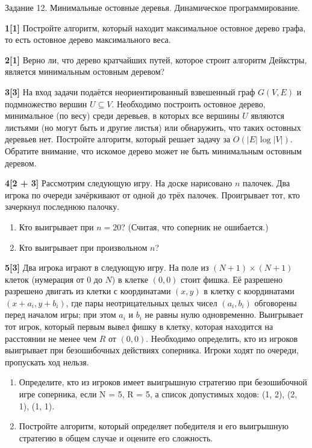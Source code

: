 \documentclass{article}
\begin{document}
\begin{center}
\Large {Задание 12. Минимальные остовные деревья. Динамическое программирование.}
\end{center}

\bigskip

\textbf{1[1]} Постройте алгоритм, который находит максимальное остовное дерево графа, то есть
остовное дерево максимального веса.

\medskip

\textbf{2[1]} Верно ли, что дерево кратчайших путей, которое строит алгоритм Дейкстры, является минимальным
остовным деревом?

\medskip

\textbf{3[3]} На вход задачи подаётся неориентированный взвешенный граф $G(V, E)$ и подмножество вершин $U \subseteq V$. Необходимо построить остовное дерево, минимальное (по весу) среди деревьев, в которых все вершины $U$ являются листьями (но могут быть и другие листья) или обнаружить, что таких остовных деревьев нет. Постройте алгоритм, который решает задачу за $O(|E| \log |V |)$. Обратите внимание, что искомое дерево может не быть минимальным остовным деревом.

\medskip

\textbf{4[2 + 3]} Рассмотрим следующую игру. На доске нарисовано $n$ палочек. Два игрока по очереди зачёркивают от одной до трёх палочек. Проигрывает тот, кто зачеркнул последнюю палочку.

\begin{enumerate}
    \item Кто выигрывает при $n = 20$? (Считая, что соперник не ошибается.)
    \item Кто выигрывает при произвольном $n$?
\end{enumerate}

\textbf{5[3]} Два игрока играют в следующую игру. На поле из $(N + 1) \times (N + 1)$ клеток (нумерация от $0$ до $N$) в клетке $(0, 0)$ стоит фишка. Её разрешено разрешено двигать из клетки с координатами $(x, y)$ в клетку с координатами $(x + a_i, y + b_i)$, где пары неотрицательных целых чисел $(a_i, b_i)$ обговорены перед началом игры; при этом $a_i$ и $b_i$ не равны нулю одновременно. Выигрывает тот игрок, который первым вывел фишку в клетку, которая находится на расстоянии не менее чем $R$ от $(0, 0)$. Необходимо определить, кто из игроков выигрывает при безошибочных действиях соперника. Игроки ходят по очереди, пропускать ход нельзя.

\begin{enumerate}
    \item Определите, кто из игроков имеет выигрышную стратегию при безошибочной игре соперника,
если N = 5, R = 5, а список допустимых ходов: (1, 2), (2, 1), (1, 1).
    \item Постройте алгоритм, который определяет победителя и его выигрышную стратегию в общем
случае и оцените его сложность.
\end{enumerate}
\end{document}
